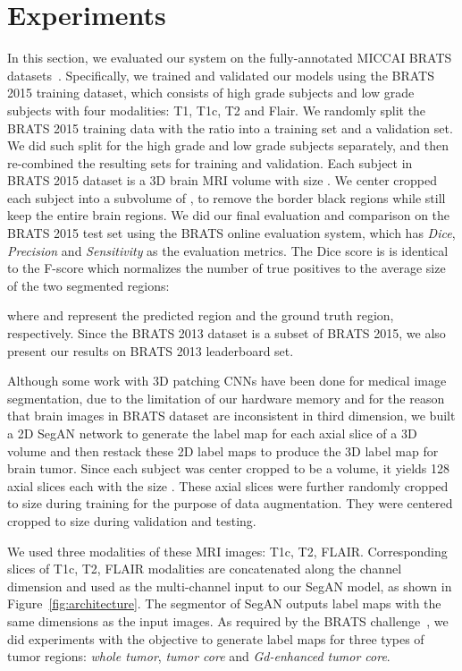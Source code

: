 \documentclass[twocolumn]{svjour3}
\begin{document}
\section{Experiments}

In this section, we evaluated our system on the fully-annotated MICCAI BRATS datasets~\cite{menze2015multimodal}.  Specifically,
we trained and validated our models using the BRATS 2015 training dataset, which consists of  high grade subjects and  low grade subjects with four modalities: T1, T1c, T2 and Flair.  We randomly split the BRATS 2015 training data with the ratio  into a training set and a validation set. We did such split for the high grade and low grade subjects separately, and then re-combined the resulting sets for training and validation.  Each subject in BRATS 2015 dataset is a 3D brain MRI volume with size .  We center cropped each subject into a subvolume of , to remove the border black regions while still keep the entire brain regions. We did our final evaluation and comparison on the BRATS 2015 test set using the BRATS online evaluation system, which has \emph{Dice}, \emph{Precision} and \emph{Sensitivity} as the evaluation metrics. The Dice score is is identical to the F-score which normalizes the number of true positives to the average size of the two segmented regions:

where  and  represent the predicted region and the ground truth region, respectively.
Since the BRATS 2013 dataset is a subset of BRATS 2015, we also present our results on BRATS 2013 leaderboard set.

Although some work with 3D patching CNNs have been done for medical image segmentation, due to the limitation of our hardware memory and for the reason that brain images in BRATS dataset are inconsistent in third dimension, we built a 2D SegAN network to generate the label map for each axial slice of a 3D volume and then restack these 2D label maps to produce the 3D label map for brain tumor. Since each subject was center cropped to be a  volume, it yields 128 axial slices each with the size . These axial slices were further randomly cropped to size  during training for the purpose of data augmentation. They were centered cropped to size  during validation and testing.

We used three modalities of these MRI images: T1c, T2, FLAIR. Corresponding slices of T1c, T2, FLAIR modalities are concatenated along the channel dimension and used as the multi-channel input to our SegAN model, as shown in  Figure~\ref{fig:architecture}.
The segmentor of SegAN outputs label maps with the same dimensions as the input images.
As required by the BRATS challenge~\cite{menze2015multimodal}, we did experiments with the objective to generate label maps for three types of tumor regions: \emph{whole tumor}, \emph{tumor core} and \emph{Gd-enhanced tumor core}.
\end{document}
